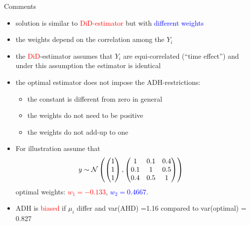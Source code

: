 \documentclass{beamer}
\newcommand{\blue}[1]{\textcolor{blue}{#1}}
\newcommand{\red}[1]{\textcolor{red}{#1}}
\begin{document}
\begin{frame}{Comments}

\begin{itemize}

\item solution is similar to \red{DiD-estimator} but with \blue{different weights}
\item the weights depend on the correlation among the $Y_i$
\item the \red{DiD}-estimator assumes that $Y_i$ are equi-correlated (``time effect'') and under this assumption the estimator is identical
\item the optimal estimator does not impose the ADH-restrictions:
\begin{itemize}
\item the constant is different from zero in general
\item the weights do not need to be positive
\item the weights do not add-up to one
\end{itemize}
\item For illustration assume that
{\footnotesize \begin{align*}
y &\sim {\cal N}\left( \begin{pmatrix} 1 \\ 1 \\ 1 \end{pmatrix}, \begin{pmatrix} 1 &  0.1 & 0.4 \\ 0.1 & 1 & 0.5 \\ 0.4 & 0.5 & 1 \end{pmatrix} \right)
\end{align*} }
optimal weights: \red{$w_1=-0.133$}, \blue{$w_2=0.4667$}.
\item ADH is \red{biased} if $\mu_i$ differ and var(AHD) =1.16 compared to var(optimal) =  0.827
\end{itemize}
\end{frame}
\end{document}
